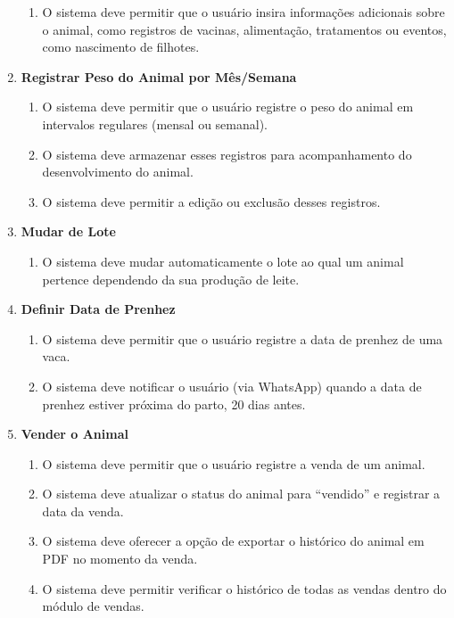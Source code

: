 \documentclass[12pt, a4paper]{article}
\begin{document}
\begin{spacing}{1.5}
\begin{enumerate}[label=RF\arabic{*}.]
\begin{enumerate}[label=RF06.0\arabic{*}]
        \item O sistema deve permitir que o usuário insira informações adicionais sobre o animal, como registros de vacinas, alimentação, tratamentos ou eventos, como nascimento de filhotes.
    \end{enumerate}
    \item \textbf{Registrar Peso do Animal por Mês/Semana}
    \begin{enumerate}[label=RF07.0\arabic{*}]
        \item O sistema deve permitir que o usuário registre o peso do animal em intervalos regulares (mensal ou semanal).
        \item O sistema deve armazenar esses registros para acompanhamento do desenvolvimento do animal.
        \item O sistema deve permitir a edição ou exclusão desses registros.
    \end{enumerate}
    \item \textbf{Mudar de Lote}
    \begin{enumerate}[label=RF08.0\arabic{*}]
        \item O sistema deve mudar automaticamente o lote ao qual um animal pertence dependendo da sua produção de leite.
    \end{enumerate}
    \item \textbf{Definir Data de Prenhez}
    \begin{enumerate}[label=RF09.0\arabic{*}]
        \item O sistema deve permitir que o usuário registre a data de prenhez de uma vaca.
        \item O sistema deve notificar o usuário (via WhatsApp) quando a data de prenhez estiver próxima do parto, 20 dias antes.
    \end{enumerate}
    \item \textbf{Vender o Animal}
    \begin{enumerate}[label=RF10.0\arabic{*}]
        \item O sistema deve permitir que o usuário registre a venda de um animal.
        \item O sistema deve atualizar o status do animal para ``vendido'' e registrar a data da venda.
        \item O sistema deve oferecer a opção de exportar o histórico do animal em PDF no momento da venda.
        \item O sistema deve permitir verificar o histórico de todas as vendas dentro do módulo de vendas.
    \end{enumerate}

\end{enumerate}
\end{spacing}
\end{document}
